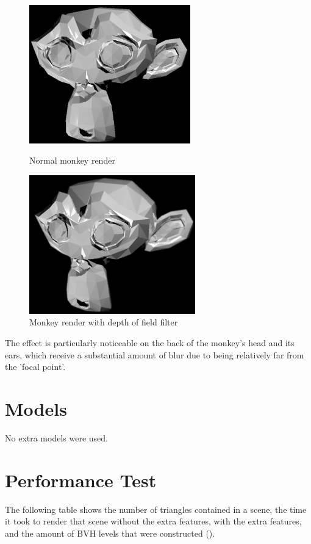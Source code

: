\documentclass{article}
\begin{document}
    \begin{figure}[!htb]
        \includegraphics[width=\linewidth, height=6cm]{images/monkey_no_bloom}
        \caption*{Normal monkey render}
      \endminipage\hfill
        \includegraphics[width=\linewidth, height=6cm]{images/monkey_dof}
        \caption*{Monkey render with depth of field filter}
      \endminipage
  \end{figure}

  The effect is particularly noticeable on the back of the monkey's head and its ears, which receive a substantial amount
  of blur due to being relatively far from the 'focal point'.

    \newpage

    \section{Models}
    No extra models were used.

    \section{Performance Test}
    The following table shows the number of triangles contained in a scene, the time it took to render that 
    scene without the extra features, with the extra features, and the amount of BVH levels that were 
    constructed ().
    
\end{document}

